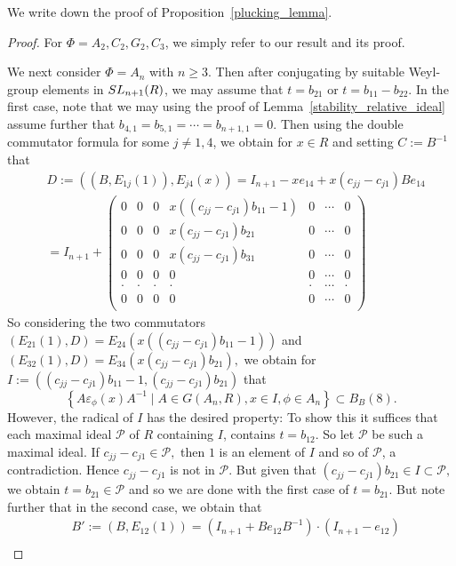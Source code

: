 \documentclass[12pt]{amsart}
\newcommand{\C}[1]{{\mathcal #1}}
\theoremstyle{definition}\newtheorem{definition}[theorem]{Definition}
\theoremstyle{remark}\newtheorem{remark}[theorem]{Remark}
\theoremstyle{definition}\newtheorem{case}{Case}
\begin{document}
We write down the proof of Proposition~\ref{plucking_lemma}.

\begin{proof}
For $\Phi=A_2,C_2,G_2,C_3$, we simply refer to our result \cite[Theorem~3.2]{General_strong_bound} and its proof. 

We next consider $\Phi=A_n$ with $n\geq 3.$ Then after conjugating by suitable Weyl-group elements in ${\rm SL}_{n+1}(R)$, we may assume that $t=b_{21}$ or $t=b_{11}-b_{22}.$ In the first case, note that we may using the proof of Lemma~\ref{stability_relative_ideal} assume further that $b_{4,1}=b_{5,1}=\cdots=b_{n+1,1}=0.$ Then using the double commutator formula \cite[Lemma~6.7]{KLM} for some $j\neq 1,4$, we obtain for $x\in R$ and setting $C:=B^{-1}$ that
\begin{align*}
&D:=\left((B,E_{1j}(1)),E_{j4}(x)\right)=I_{n+1}-xe_{14}+x(c_{jj}-c_{j1})Be_{14}\\
&=I_{n+1}+
\begin{pmatrix}
0 & 0 & 0 & x((c_{jj}-c_{j1})b_{11}-1) & 0 & \cdots & 0\\
0 & 0 & 0 & x(c_{jj}-c_{j1})b_{21} & 0 & \cdots & 0\\
0 & 0 & 0 & x(c_{jj}-c_{j1})b_{31} & 0 & \cdots & 0\\
0 & 0 & 0 & 0 & 0 & \cdots & 0\\
\cdot & \cdot & \cdot & \cdot & \cdot & \cdots & \cdot\\
0 & 0 & 0 & 0 & 0 & \cdots & 0\\
\end{pmatrix}
\end{align*}
So considering the two commutators $(E_{21}(1),D)=E_{24}(x((c_{jj}-c_{j1})b_{11}-1))$ and $(E_{32}(1),D)=E_{34}(x(c_{jj}-c_{j1})b_{21}),$ we obtain for $I:=((c_{jj}-c_{j1})b_{11}-1,(c_{jj}-c_{j1})b_{21})$ that 
\[
\left\{A\varepsilon_{\phi}(x)A^{-1}\mid A\in G(A_n,R),x\in I,\phi\in A_n\right\}\subset B_B(8).
\]
However, the radical of $I$ has the desired property: To show this it suffices that each maximal ideal $\C P$ of $R$ containing $I$, contains $t=b_{12}.$ So let $\C P$ be such a maximal ideal. If $c_{jj}-c_{j1}\in\C P,$ then $1$ is an element of $I$ and so of $\C P$, a contradiction. Hence $c_{jj}-c_{j1}$ is not in $\C P.$ But given that $(c_{jj}-c_{j1})b_{21}\in I\subset\C P,$ we obtain $t=b_{21}\in\C P$ and so we are done with the first case of $t=b_{21}.$ But note further that in the second case, we obtain that 
\begin{align*}
&B':=\left(B,E_{12}(1)\right)=(I_{n+1}+Be_{12}B^{-1})\cdot (I_{n+1}-e_{12})\\

\end{align*}
\end{proof}
\end{document}
